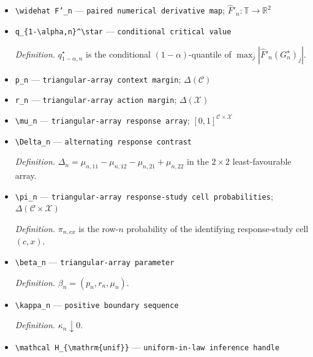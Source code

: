 \documentclass{article}
\begin{document}
\begin{itemize}
  \item \texttt{\textbackslash{}\allowbreak{}widehat F'\_\allowbreak{}n} --- \texttt{paired numerical derivative map}; \(\widehat F'_n:\mathbb T\to\mathbb R^2\)
  \item \texttt{q\_\allowbreak{}\{1-\allowbreak{}\textbackslash{}\allowbreak{}alpha,\allowbreak{}n\}\allowbreak{}\textasciicircum{}\textbackslash{}\allowbreak{}star} --- \texttt{conditional critical value}
  \par\smallskip\noindent\emph{Definition.} \(q_{1-\alpha,n}^\star\) is the conditional \((1-\alpha)\)-quantile of \(\max_j|\widehat F'_n(G_n^\star)_j|\).
  \item \texttt{p\_\allowbreak{}n} --- \texttt{triangular-\allowbreak{}array context margin}; \(\Delta(\mathcal C)\)
  \item \texttt{r\_\allowbreak{}n} --- \texttt{triangular-\allowbreak{}array action margin}; \(\Delta(\mathcal X)\)
  \item \texttt{\textbackslash{}\allowbreak{}mu\_\allowbreak{}n} --- \texttt{triangular-\allowbreak{}array response array}; \([0,1]^{\mathcal C\times\mathcal X}\)
  \item \texttt{\textbackslash{}\allowbreak{}Delta\_\allowbreak{}n} --- \texttt{alternating response contrast}
  \par\smallskip\noindent\emph{Definition.} \(\Delta_n=\mu_{n,11}-\mu_{n,12}-\mu_{n,21}+\mu_{n,22}\) in the \(2\times2\) least-favourable array.
  \item \texttt{\textbackslash{}\allowbreak{}pi\_\allowbreak{}n} --- \texttt{triangular-\allowbreak{}array response-\allowbreak{}study cell probabilities}; \(\Delta(\mathcal C\times\mathcal X)\)
  \par\smallskip\noindent\emph{Definition.} \(\pi_{n,cx}\) is the row-\(n\) probability of the identifying response-study cell \((c,x)\).
  \item \texttt{\textbackslash{}\allowbreak{}beta\_\allowbreak{}n} --- \texttt{triangular-\allowbreak{}array parameter}
  \par\smallskip\noindent\emph{Definition.} \(\beta_n=(p_n,r_n,\mu_n)\).
  \item \texttt{\textbackslash{}\allowbreak{}kappa\_\allowbreak{}n} --- \texttt{positive boundary sequence}
  \par\smallskip\noindent\emph{Definition.} \(\kappa_n\downarrow0\).
  \item \texttt{\textbackslash{}\allowbreak{}mathcal H\_\allowbreak{}\{\textbackslash{}\allowbreak{}mathrm\{unif\}\allowbreak{}\}\allowbreak{}} --- \texttt{uniform-\allowbreak{}in-\allowbreak{}law inference handle}

\end{itemize}
\end{document}

